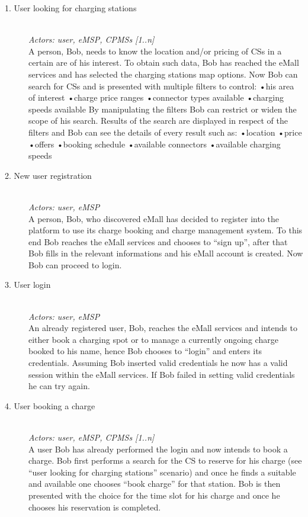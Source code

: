 \documentclass[11pt]{article}
\begin{document}
\begin{description}
    \item [1. User looking for charging stations] \hfill \\
        \textit{Actors: user, eMSP, CPMSs [1..n]} \\
        A person, Bob, needs to know the location and/or pricing of CSs in a certain are of his interest. To obtain such data, Bob has reached the eMall services and has selected the charging stations map options. Now Bob can search for CSs and is presented with multiple filters to control:
        •his area of interest
        •charge price ranges
        •connector types available
        •charging speeds available
        By manipulating the filters Bob can restrict or widen the scope of his search. Results of the search are displayed in respect of the filters and Bob can see the details of every result such as:
        •location
        •price
        •offers
        •booking schedule
        •available connectors
        •available charging speeds
    \item [2. New user registration] \hfill \\
        \textit{Actors: user, eMSP} \\
        A person, Bob, who discovered eMall has decided to register into the platform to use its charge booking and charge management system. To this end Bob reaches the eMall services and chooses to “sign up”, after that Bob fills in the relevant informations and his eMall account is created. Now Bob can proceed to login.
    \item [3. User login] \hfill \\
        \textit{Actors: user, eMSP} \\
        An already registered user, Bob, reaches the eMall services and intends to either book a charging spot or to manage a currently ongoing charge booked to his name, hence Bob chooses to “login” and enters its credentials. Assuming Bob inserted valid credentials he now has a valid session within the eMall services. If Bob failed in setting valid credentials he can try again.
    \item [4. User booking a charge] \hfill \\
        \textit{Actors: user, eMSP, CPMSs [1..n]} \\
        A user Bob has already performed the login and now intends to book a charge. Bob first performs a search for the CS to reserve for his charge (see “user looking for charging stations” scenario) and once he finds a suitable and available one chooses “book charge” for that station. Bob is then presented with the choice for the time slot for his charge and once he chooses his reservation is completed.

\end{description}
\end{document}

